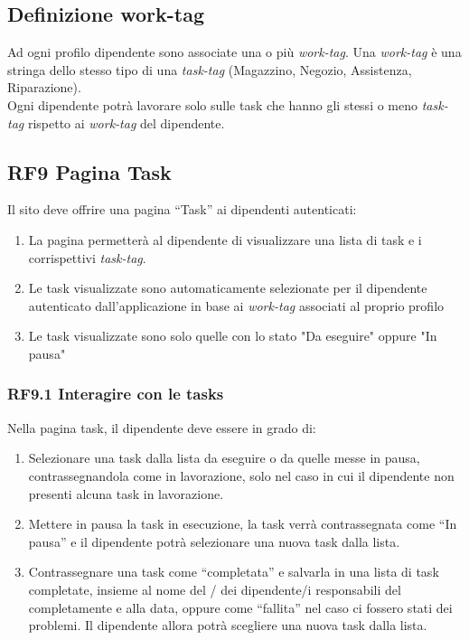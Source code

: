 \documentclass{report}
\begin{document}
\subsection*{Definizione work-tag}
Ad ogni profilo dipendente sono associate una o più \textit{work-tag}. Una \textit{work-tag} è una stringa dello stesso tipo di una \textit{task-tag} (Magazzino, Negozio, Assistenza, Riparazione).\\
Ogni dipendente potrà lavorare solo sulle task che hanno gli stessi o meno \textit{task-tag} rispetto ai \textit{work-tag} del dipendente.


\subsection*{RF9 Pagina Task}

Il sito deve offrire una pagina “Task” ai dipendenti autenticati:

\begin{enumerate}
	\item La pagina permetterà al dipendente di visualizzare una lista di task e i corrispettivi \textit{task-tag}.
	
	\item Le task visualizzate sono automaticamente selezionate per il dipendente autenticato dall’applicazione in base ai \textit{work-tag} associati al proprio profilo
	
	\item Le task visualizzate sono solo quelle con lo stato "Da eseguire" oppure "In pausa"

	
\end{enumerate}

\subsubsection*{RF9.1 Interagire con le tasks}

Nella pagina task, il dipendente deve essere in grado di:


\begin{enumerate}
	\item Selezionare una task dalla lista da eseguire o da quelle messe in pausa, contrassegnandola come in lavorazione, solo nel caso in cui il dipendente non presenti alcuna task in lavorazione.
	
	\item Mettere in pausa la task in esecuzione, la task verrà contrassegnata come “In pausa” e il dipendente potrà selezionare una nuova task dalla lista.
	
	\item Contrassegnare una task come “completata” e salvarla in una lista di task completate, insieme al nome del / dei dipendente/i responsabili del completamente e alla data, oppure come “fallita” nel caso ci fossero stati dei problemi. Il dipendente allora potrà scegliere una nuova task dalla lista.
\end{enumerate}
\end{document}
